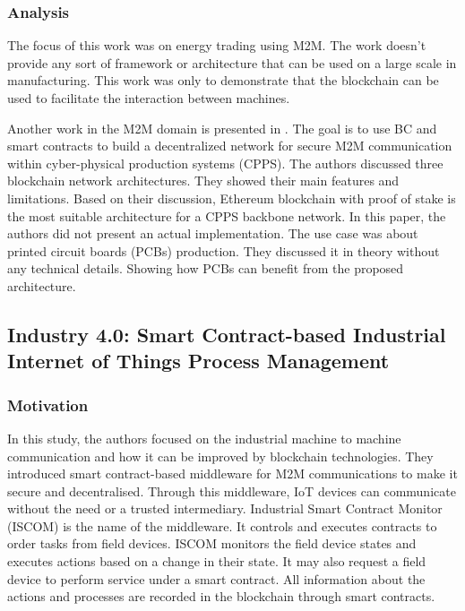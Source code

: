 \documentclass[runningheads]{llncs}
\begin{document}
\subsubsection{Analysis}
The focus of this work was on energy trading using M2M. The work doesn't provide any sort of framework or architecture that can be used on a large scale in manufacturing. This work was only to demonstrate that the blockchain can be used to facilitate the interaction between machines.
\bigbreak

\noindent
Another work in the M2M domain is presented in \cite{Afanasev2018}.  The goal is to use BC and smart contracts to build a decentralized network for secure M2M communication within cyber-physical production systems (CPPS). The authors discussed three blockchain network architectures. They showed their main features and limitations. Based on their discussion, Ethereum blockchain with proof of stake is the most suitable architecture for a CPPS backbone network. In this paper, the authors did not present an actual implementation. The use case was about printed circuit boards (PCBs) production. They discussed it in theory without any technical details.  Showing how PCBs can benefit from the proposed architecture.
 
\newpage
\subsection{Industry 4.0: Smart Contract-based Industrial Internet of Things Process Management \cite{Garrocho2019}}
\subsubsection{Motivation}
In this study, the authors focused on the industrial machine to machine communication and how it can be improved by blockchain technologies. They introduced smart contract-based middleware for M2M communications to make it secure and decentralised. Through this middleware, IoT devices can communicate without the need or a trusted intermediary. Industrial Smart Contract Monitor (ISCOM) is the name of the middleware. It controls and executes contracts to order tasks from field devices. ISCOM monitors the field device states and executes actions based on a change in their state. It may also request a field device to perform service under a smart contract. All information about the actions and processes are recorded in the blockchain through smart contracts. 
\end{document}
